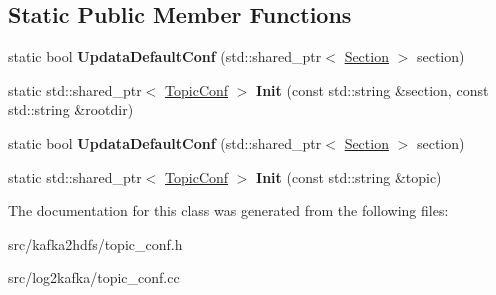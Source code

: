 \subsection*{Static Public Member Functions}
\begin{DoxyCompactItemize}
\item 
static bool {\bfseries Updata\+Default\+Conf} (std\+::shared\+\_\+ptr$<$ \hyperlink{classlog2hdfs_1_1Section}{Section} $>$ section)\hypertarget{classlog2hdfs_1_1TopicConf_a5180f284c0668f1345143bbb3f929f2f}{}\label{classlog2hdfs_1_1TopicConf_a5180f284c0668f1345143bbb3f929f2f}

\item 
static std\+::shared\+\_\+ptr$<$ \hyperlink{classlog2hdfs_1_1TopicConf}{Topic\+Conf} $>$ {\bfseries Init} (const std\+::string \&section, const std\+::string \&rootdir)\hypertarget{classlog2hdfs_1_1TopicConf_a55b5fe50959d06940eb8b4198eeef855}{}\label{classlog2hdfs_1_1TopicConf_a55b5fe50959d06940eb8b4198eeef855}

\item 
static bool {\bfseries Updata\+Default\+Conf} (std\+::shared\+\_\+ptr$<$ \hyperlink{classlog2hdfs_1_1Section}{Section} $>$ section)\hypertarget{classlog2hdfs_1_1TopicConf_aa022fa11f53f2edb7ed49dabce25cce9}{}\label{classlog2hdfs_1_1TopicConf_aa022fa11f53f2edb7ed49dabce25cce9}

\item 
static std\+::shared\+\_\+ptr$<$ \hyperlink{classlog2hdfs_1_1TopicConf}{Topic\+Conf} $>$ {\bfseries Init} (const std\+::string \&topic)\hypertarget{classlog2hdfs_1_1TopicConf_a095eb20dd881c8e261405934596ae3eb}{}\label{classlog2hdfs_1_1TopicConf_a095eb20dd881c8e261405934596ae3eb}

\end{DoxyCompactItemize}


The documentation for this class was generated from the following files\+:\begin{DoxyCompactItemize}
\item 
src/kafka2hdfs/topic\+\_\+conf.\+h\item 
src/log2kafka/topic\+\_\+conf.\+cc\end{DoxyCompactItemize}
